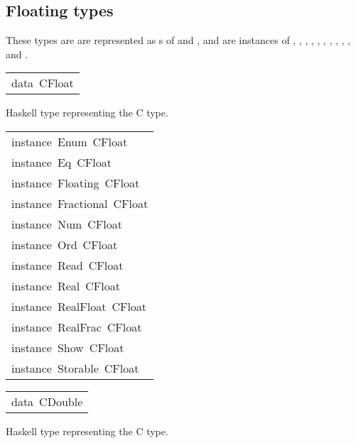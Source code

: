 \subsection{Floating types
}
These types are are represented as s of
  and , and are instances of
 , , , ,
 , , ,
 , , ,
  and .
\par

\begin{haddockdesc}
\item[\begin{tabular}{@{}l}
data\ CFloat
\end{tabular}]\haddockbegindoc
Haskell type representing the C  type.
\par

\end{haddockdesc}
\begin{haddockdesc}
\item[\begin{tabular}{@{}l}
instance\ Enum\ CFloat\\instance\ Eq\ CFloat\\instance\ Floating\ CFloat\\instance\ Fractional\ CFloat\\instance\ Num\ CFloat\\instance\ Ord\ CFloat\\instance\ Read\ CFloat\\instance\ Real\ CFloat\\instance\ RealFloat\ CFloat\\instance\ RealFrac\ CFloat\\instance\ Show\ CFloat\\instance\ Storable\ CFloat
\end{tabular}]
\end{haddockdesc}
\begin{haddockdesc}
\item[\begin{tabular}{@{}l}
data\ CDouble
\end{tabular}]\haddockbegindoc
Haskell type representing the C  type.
\par

\end{haddockdesc}
